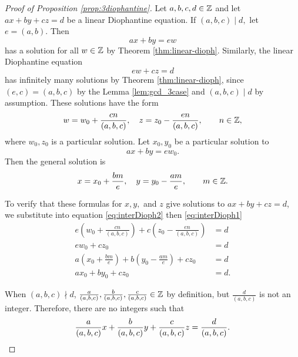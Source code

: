\documentclass{ximera}
\begin{document}
\begin{proof}[Proof of Proposition \ref{prop:3diophantine}]
    Let $a,b,c,d\in\mathbb Z$ and let $ax+by+cz=d$ be a linear Diophantine equation. If $(a,b,c)\mid d,$ let $e=(a,b).$ 
    Then \begin{equation}\label{eq:interDioph1}ax+by=ew\end{equation} has a solution for all $w\in\mathbb Z$ by Theorem \ref{thm:linear-dioph}.
    Similarly, the linear Diophantine equation \begin{equation}\label{eq:interDioph2}
        ew+cz=d
    \end{equation} has infinitely many solutions by Theorem \ref{thm:linear-dioph}, since $(e,c)=(a,b,c)$ by the Lemma \ref{lem:gcd_3case} and $(a,b,c)\mid d$ by assumption. These solutions have the form 
    \[w=w_0+\frac{cn}{(a,b,c)},\quad z=z_0-\frac{en}{(a,b,c)},\qquad n\in\mathbb Z,\]
    where $w_0,z_0$ is a particular solution. Let $x_0,y_0$ be a particular solution to \[ax+by=ew_0.\] Then the general solution is 
    \[x=x_0+\frac{bm}{e},\quad y=y_0-\frac{am}{e},\qquad m\in\mathbb Z.\]

    To verify that these formulas for $x,y,$ and $z$ give solutions to $ax+by+cz=d$, we substitute into equation \ref{eq:interDioph2} then \ref{eq:interDioph1}
    \begin{align*}
        e\left(w_0+\frac{cn}{(a,b,c)}\right)+c\left(z_0-\frac{en}{(a,b,c)}\right)&=d\\
        e w_0 + c z_0 & =d\\
        a\left(x_0+\frac{bm}{e}\right)+b\left(y_0-\frac{am}{e}\right)+cz _0 &=d\\
        ax_0+by_0+c z_0&=d.
    \end{align*}

    When $(a,b,c)\nmid d$, $\frac{a}{(a,b,c)},\frac{b}{(a,b,c)},\frac{c}{(a,b,c)}\in\mathbb Z$ by definition, but $\frac{d}{(a,b,c)}$ is not an integer. Therefore, there are no integers such that \[\frac{a}{(a,b,c)}x+\frac{b}{(a,b,c)}y+\frac{c}{(a,b,c)}z=\frac{d}{(a,b,c)}. \qedhere\] 
\end{proof}

\end{document}
